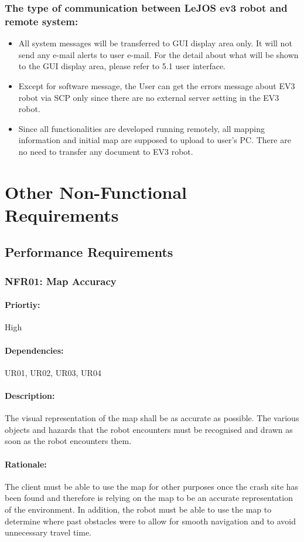 \documentclass[10pt,a4paper,titlepage]{article}
\begin{document}
	\subsubsection*{The type of communication between LeJOS ev3 robot and remote system:}
	\begin{itemize}
		\item All system messages will be transferred to GUI display area only. It will not send any e-mail alerts to user e-mail. For the detail about what will be shown to the GUI display area, please refer to 5.1 user interface.
		\item Except for software message, the User can get the errors message about EV3 robot via SCP only since there are no external server setting in the EV3 robot.
		\item Since all functionalities are developed running remotely, all mapping information and initial map are supposed to upload to user’s PC. There are no need to transfer any document to EV3 robot.
	\end{itemize}
	
	\section{Other Non-Functional Requirements}
	
	\subsection{Performance Requirements}
	\subsubsection*{NFR01: Map Accuracy}
	\paragraph{Priortiy:} High
	\paragraph{Dependencies:} UR01, UR02, UR03, UR04
	\paragraph{Description:} The visual representation of the map shall be as accurate as possible. The various objects and hazards that the robot encounters must be recognised and drawn as soon as the robot encounters them.
	\paragraph{Rationale:} The client must be able to use the map for other purposes once the crash site has been found and therefore is relying on the map to be an accurate representation of the environment. In addition, the robot must be able to use the map to determine where past obstacles were to allow for smooth navigation and to avoid unnecessary travel time.\\
	
\end{document}
